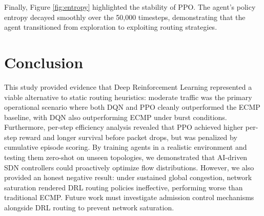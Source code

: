 \documentclass[10pt,twocolumn,letterpaper]{article}
\begin{document}
Finally, Figure \ref{fig:entropy} highlighted the stability of PPO. The agent's policy entropy decayed smoothly over the 50,000 timesteps, demonstrating that the agent transitioned from exploration to exploiting routing strategies.

\section{Conclusion}
This study provided evidence that Deep Reinforcement Learning represented a viable alternative to static routing heuristics: moderate traffic was the primary operational scenario where both DQN and PPO cleanly outperformed the ECMP baseline, with DQN also outperforming ECMP under burst conditions. Furthermore, per-step efficiency analysis revealed that PPO achieved higher per-step reward and longer survival before packet drops, but was penalized by cumulative episode scoring. By training agents in a realistic environment and testing them zero-shot on unseen topologies, we demonstrated that AI-driven SDN controllers could proactively optimize flow distributions. However, we also provided an honest negative result: under sustained global congestion, network saturation rendered DRL routing policies ineffective, performing worse than traditional ECMP. Future work must investigate admission control mechanisms alongside DRL routing to prevent network saturation.

{\small


}
\end{document}
